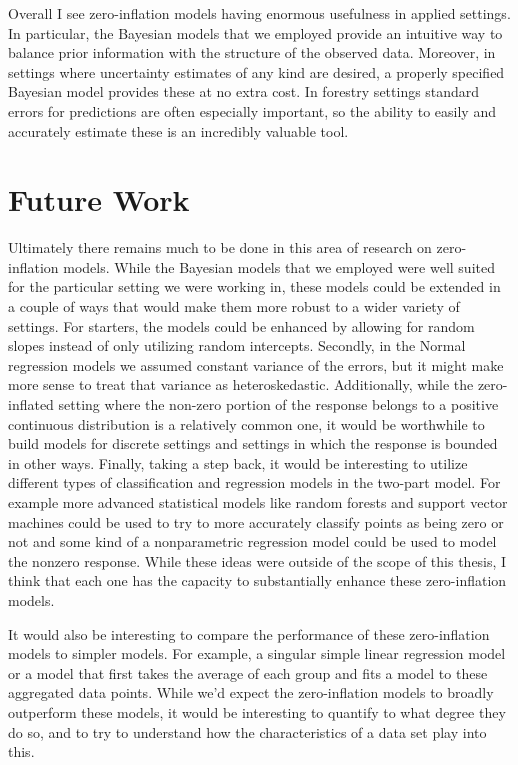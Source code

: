 \documentclass[12pt,twoside]{reedthesis}
\begin{document}
Overall I see zero-inflation models having enormous usefulness in applied settings. In particular, the Bayesian models that we employed provide an intuitive way to balance prior information with the structure of the observed data. Moreover, in settings where uncertainty estimates of any kind are desired, a properly specified Bayesian model provides these at no extra cost. In forestry settings standard errors for predictions are often especially important, so the ability to easily and accurately estimate these is an incredibly valuable tool.

\hypertarget{future-work}{%
\section{Future Work}\label{future-work}}

Ultimately there remains much to be done in this area of research on zero-inflation models. While the Bayesian models that we employed were well suited for the particular setting we were working in, these models could be extended in a couple of ways that would make them more robust to a wider variety of settings. For starters, the models could be enhanced by allowing for random slopes instead of only utilizing random intercepts. Secondly, in the Normal regression models we assumed constant variance of the errors, but it might make more sense to treat that variance as heteroskedastic. Additionally, while the zero-inflated setting where the non-zero portion of the response belongs to a positive continuous distribution is a relatively common one, it would be worthwhile to build models for discrete settings and settings in which the response is bounded in other ways. Finally, taking a step back, it would be interesting to utilize different types of classification and regression models in the two-part model. For example more advanced statistical models like random forests and support vector machines could be used to try to more accurately classify points as being zero or not and some kind of a nonparametric regression model could be used to model the nonzero response. While these ideas were outside of the scope of this thesis, I think that each one has the capacity to substantially enhance these zero-inflation models.

It would also be interesting to compare the performance of these zero-inflation models to simpler models. For example, a singular simple linear regression model or a model that first takes the average of each group and fits a model to these aggregated data points. While we'd expect the zero-inflation models to broadly outperform these models, it would be interesting to quantify to what degree they do so, and to try to understand how the characteristics of a data set play into this.
\end{document}

